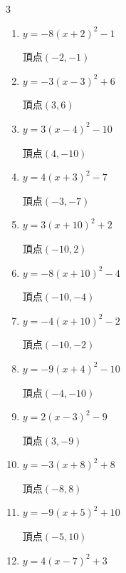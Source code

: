 \begin{multicols}{3}
\begin{enumerate}
  \item $\displaystyle y=-8\left( x+2\right)^{2}-1$

        $\displaystyle 頂点\left( -2 , -1 \right)$

  \item $\displaystyle y=-3\left( x-3\right)^{2}+6$

        $\displaystyle 頂点\left( 3 , 6 \right)$

  \item $\displaystyle y=3\left( x-4\right)^{2}-10$

        $\displaystyle 頂点\left( 4 , -10 \right)$

  \item $\displaystyle y=4\left( x+3\right)^{2}-7$

        $\displaystyle 頂点\left( -3 , -7 \right)$

  \item $\displaystyle y=3\left( x+10\right)^{2}+2$

        $\displaystyle 頂点\left( -10 , 2 \right)$

  \item $\displaystyle y=-8\left( x+10\right)^{2}-4$

        $\displaystyle 頂点\left( -10 , -4 \right)$

  \item $\displaystyle y=-4\left( x+10\right)^{2}-2$

        $\displaystyle 頂点\left( -10 , -2 \right)$

  \item $\displaystyle y=-9\left( x+4\right)^{2}-10$

        $\displaystyle 頂点\left( -4 , -10 \right)$

  \item $\displaystyle y=2\left( x-3\right)^{2}-9$

        $\displaystyle 頂点\left( 3 , -9 \right)$

  \item $\displaystyle y=-3\left( x+8\right)^{2}+8$

        $\displaystyle 頂点\left( -8 , 8 \right)$

  \item $\displaystyle y=-9\left( x+5\right)^{2}+10$

        $\displaystyle 頂点\left( -5 , 10 \right)$

  \item $\displaystyle y=4\left( x-7\right)^{2}+3$


\end{enumerate}
\end{multicols}
